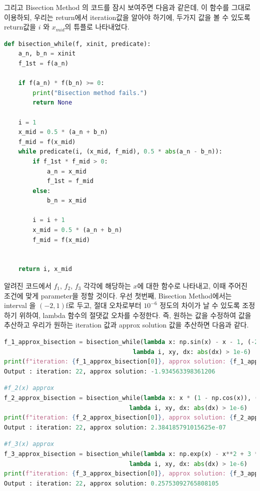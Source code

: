 \documentclass[11pt]{article}
\begin{document}
\noindent
그리고 Bisection Method 의 코드를 잠시 보여주면 다음과 같은데, 이 함수를 그대로 이용하되, 우리는 return에서 iteration값을 알아야 하기에, 두가지 값을 볼 수 있도록 return값을 $i$ 와 $x_{mid}$의 튜플로 나타내었다.

\begin{lstlisting}[language=Python]
def bisection_while(f, xinit, predicate):
    a_n, b_n = xinit
    f_1st = f(a_n)

    if f(a_n) * f(b_n) >= 0:
        print("Bisection method fails.")
        return None

    i = 1
    x_mid = 0.5 * (a_n + b_n)
    f_mid = f(x_mid)
    while predicate(i, (x_mid, f_mid), 0.5 * abs(a_n - b_n)):
        if f_1st * f_mid > 0:
            a_n = x_mid
            f_1st = f_mid
        else:
            b_n = x_mid

        i = i + 1
        x_mid = 0.5 * (a_n + b_n)
        f_mid = f(x_mid)
        

    return i, x_mid
\end{lstlisting}

\noindent
알려진 코드에서 $f_1$, $f_2$, $f_3$ 각각에 해당하는 $x$에 대한 함수로 나타내고, 이때 주어진 조건에 맞게 parameter을 정할 것이다. 우선 첫번째, Bisection Method에서는 interval 을 $(-2, 1)$f로 두고, 절대 오차로부터 $10^{-6}$ 정도의 차이가 날 수 있도록 조정하기 위하여, lambda 함수의 절댓값 오차를 수정한다. 즉, 원하는 값을 수정하여 값을 추산하고 우리가 원하는 iteration 값과 approx solution 값을 추산하면 다음과 같다.

\begin{lstlisting}[language=Python]
f_1_approx_bisection = bisection_while(lambda x: np.sin(x) - x - 1, (-2,1), 
									lambda i, xy, dx: abs(dx) > 1e-6)
print(f"iteration: {f_1_approx_bisection[0]}, approx solution: {f_1_approx_bisection[1]}") 
Output : iteration: 22, approx solution: -1.934563398361206
\end{lstlisting}


\begin{lstlisting}[language=Python]
#f_2(x) approx
f_2_approx_bisection = bisection_while(lambda x: x * (1 - np.cos(x)), (-2,1),
                                   lambda i, xy, dx: abs(dx) > 1e-6)
print(f"iteration: {f_2_approx_bisection[0]}, approx solution: {f_2_approx_bisection[1]}")
Output : iteration: 22, approx solution: 2.384185791015625e-07
\end{lstlisting}

\begin{lstlisting}[language=Python]
#f_3(x) approx
f_3_approx_bisection = bisection_while(lambda x: np.exp(x) - x**2 + 3 * x - 2, (-2,1),
                                   lambda i, xy, dx: abs(dx) > 1e-6)
print(f"iteration: {f_3_approx_bisection[0]}, approx solution: {f_3_approx_bisection[1]}")
Output : iteration: 22, approx solution: 0.25753092765808105
\end{lstlisting}
\end{document}
